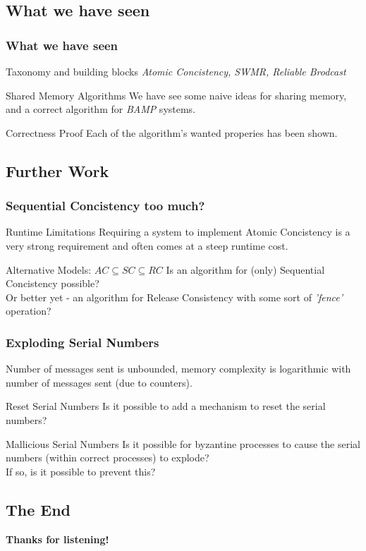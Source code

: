 \subsection{What we have seen}
\begin{frame}
    \frametitle{What we have seen}
    \begin{block}{Taxonomy and building blocks}
        \emph{Atomic Concistency, SWMR, Reliable Brodcast}
    \end{block}
    \begin{block}{Shared Memory Algorithms}
        We have see some naive ideas for sharing memory, and a correct algorithm for \emph{BAMP} systems.
    \end{block}
    \begin{block}{Correctness Proof}
        Each of the algorithm's wanted properies has been shown.
    \end{block}
\end{frame}

\subsection{Further Work}
\begin{frame}
    \frametitle{Sequential Concistency too much?}
    \begin{alertblock}{Runtime Limitations}
        Requiring a system to implement Atomic Concistency is a very strong requirement
        and often comes at a steep runtime cost.
    \end{alertblock}
    \begin{block}{Alternative Models: $AC\subseteq SC\subseteq RC$}
        Is an algorithm for (only) Sequential Concistency possible?\\
        Or better yet - an algorithm for Release Consistency with some sort of
        \emph{'fence'} operation?
    \end{block}
\end{frame}

\begin{frame}
    \frametitle{Exploding Serial Numbers}
    Number of messages sent is unbounded, memory complexity
    is logarithmic with number of messages sent (due to counters).
    \begin{block}{Reset Serial Numbers}
        Is it possible to add a mechanism to reset the serial numbers?
    \end{block}
    \begin{block}{Mallicious Serial Numbers}
        Is it possible for byzantine processes to cause the serial numbers (within correct processes) to explode?\\
        If so, is it possible to prevent this?
    \end{block}
\end{frame}

\subsection{The End}
\begin{frame}
    \begin{center}
        \textbf{Thanks for listening!}
    \end{center}
\end{frame}